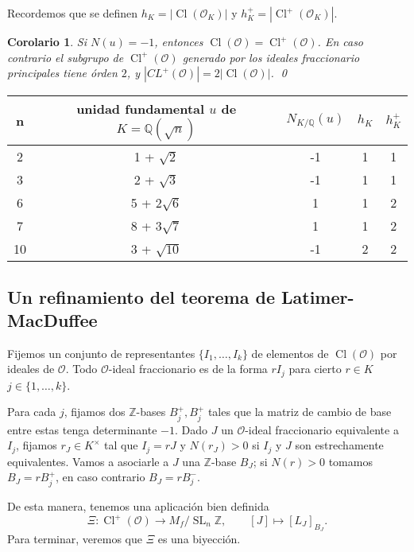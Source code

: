 \documentclass[11pt,a4paper]{amsart}
\newcommand{\Q}{\mathbb{Q}}
\newcommand{\Z}{\mathbb{Z}}
\DeclareMathOperator{\SL}{SL}
\DeclareMathOperator{\CL}{Cl}
\numberwithin{equation}{section}
\theoremstyle{plain}
\newtheorem{coro}[equation]{Corolario}
\renewcommand{\O}{\mathcal{O}}
\begin{document}
Recordemos que se definen
$h_K = |\CL(\O_K)|$ y $h_K^+ = |\CL^+(\O_K)|$.

\begin{coro} Si $N(u) = -1$, entonces $\CL(\O) = \CL^+(\O)$. En caso
contrario el subgrupo de $\CL^+(\O)$ generado por los ideales
fraccionario principales tiene órden $2$, y
$|CL^+(\O)| = 2|\CL(\O)|$.
\qed
\end{coro}

\begin{center}
\begin{tabular}{c | c | c | c | c}
n &  unidad fundamental $u$ de $K = \Q(\sqrt{n})$ & $N_{K/\Q}(u)$ & $h_K$ & $h_K^+$\\
\hline
2 & 1 + $\sqrt{2}$ & -1 & 1 & 1 \\
\hline
3 & 2 + $\sqrt{3}$ & -1 & 1 & 1 \\
\hline
6 & 5 + 2$\sqrt{6}$ & 1 & 1 & 2 \\
\hline
7 & 8 + 3$\sqrt{7}$ & 1 & 1 & 2 \\
\hline
10 & 3 + $\sqrt{10}$ & -1 & 2 & 2 \\
\end{tabular}
\end{center}

\subsection{Un refinamiento del teorema de Latimer-MacDuffee}

Fijemos un conjunto de representantes $\{I_1,\ldots, I_k\}$ de
elementos de $\CL(\O)$ por ideales de $\O$. Todo $\O$-ideal fraccionario
es de la forma $r I_j$ para cierto $r \in K$ $j \in \{1,\ldots,k\}$.

Para cada $j$, fijamos dos $\Z$-bases $B^+_j, B^+_j$ tales que
la matriz de cambio de base entre estas tenga determinante $-1$.
Dado $J$ un $\O$-ideal fraccionario equivalente a $I_j$, fijamos
$r_J \in K^\times$ tal que $I_j = rJ$ y $N(r_J) > 0$ si $I_j$ y $J$
son estrechamente equivalentes. Vamos a asociarle a $J$ una $\Z$-base $B_J$;
si $N(r)>0$ tomamos $B_J = rB_j^+$, en caso contrario $B_J = rB_j^-$.

De esta manera, tenemos una aplicación bien definida
\begin{equation}\label{def:xi}
  \Xi \colon \CL^+(\O) \to M_f/\SL_n \Z, \qquad [J] \mapsto [L_{J}]_{B_J}.
\end{equation}
Para terminar, veremos que $\Xi$ es una biyección.
\end{document}
